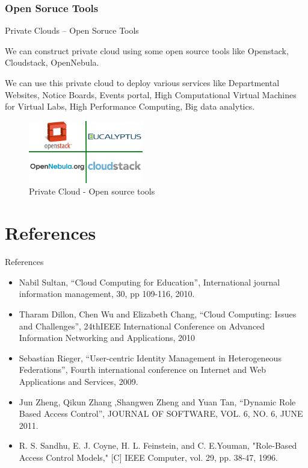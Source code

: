 \documentclass[xcolor=dvipsnames]{beamer}
\begin{document}
\subsubsection{Open Soruce Tools}
\begin{frame}{Private Clouds -- Open Soruce Tools}

We can construct private cloud using some open source tools like Openstack, Cloudstack, OpenNebula. \\

\hspace{4cm} 

We can use this private cloud to deploy various services like Departmental Websites, Notice Boards, Events portal, High Computational Virtual Machines for Virtual Labs, High Performance Computing, Big data analytics.
\begin{figure}[H]
 \centering
 \includegraphics[width=5cm]{./cloud.jpg}
 \caption{Private Cloud - Open source tools \label{fig:cloud} }
\end{figure}

\end{frame}


\section{References}
\small
\begin{frame}{References}
\begin{itemize}
\item Nabil Sultan, ``Cloud Computing for Education”, International journal information management, 30, pp 109-116, 2010.
\item Tharam Dillon, Chen Wu and Elizabeth Chang, ``Cloud Computing: Issues and Challenges'',  24thIEEE International Conference on Advanced Information Networking and Applications, 2010 
\item Sebastian Rieger, ``User-centric Identity Management in Heterogeneous Federations'', Fourth international conference on Internet and Web Applications and Services, 2009.
\item Jun Zheng, Qikun Zhang ,Shangwen Zheng and Yuan Tan, ``Dynamic Role Based Access Control'',  JOURNAL OF SOFTWARE, VOL. 6, NO. 6, JUNE 2011.
\item R. S. Sandhu, E. J. Coyne, H. L. Feinstein, and C. E.Youman, "Role-Based Access Control Models," [C] IEEE Computer, vol. 29, pp. 38-47, 1996.

\end{itemize}
\end{frame}
\end{document}
